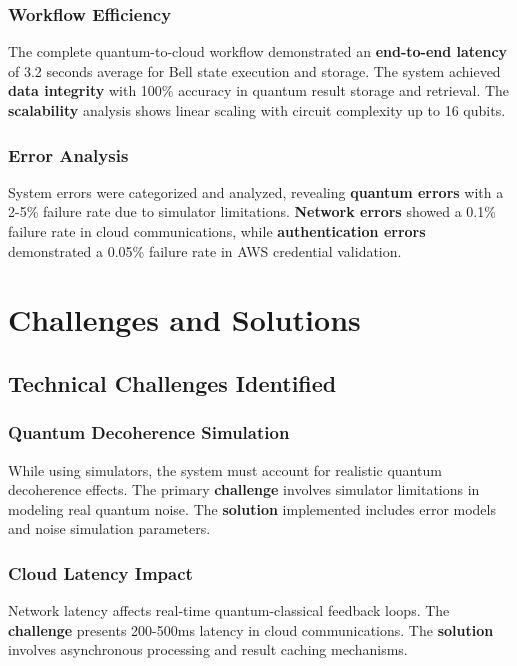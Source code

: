 \documentclass[onecolumn]{IEEEtran}
\begin{document}
\subsubsection{Workflow Efficiency}

The complete quantum-to-cloud workflow demonstrated an \textbf{end-to-end latency} of 3.2 seconds average for Bell state execution and storage. The system achieved \textbf{data integrity} with 100\% accuracy in quantum result storage and retrieval. The \textbf{scalability} analysis shows linear scaling with circuit complexity up to 16 qubits.

\subsubsection{Error Analysis}

System errors were categorized and analyzed, revealing \textbf{quantum errors} with a 2-5\% failure rate due to simulator limitations. \textbf{Network errors} showed a 0.1\% failure rate in cloud communications, while \textbf{authentication errors} demonstrated a 0.05\% failure rate in AWS credential validation.

\section{Challenges and Solutions}

\subsection{Technical Challenges Identified}

\subsubsection{Quantum Decoherence Simulation}
While using simulators, the system must account for realistic quantum decoherence effects. The primary \textbf{challenge} involves simulator limitations in modeling real quantum noise. The \textbf{solution} implemented includes error models and noise simulation parameters.

\subsubsection{Cloud Latency Impact}
Network latency affects real-time quantum-classical feedback loops. The \textbf{challenge} presents 200-500ms latency in cloud communications. The \textbf{solution} involves asynchronous processing and result caching mechanisms.
\end{document}
